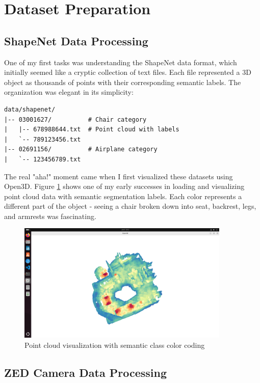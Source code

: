 \documentclass[12pt,a4paper]{report}
\begin{document}
\section{Dataset Preparation}

\subsection{ShapeNet Data Processing}

One of my first tasks was understanding the ShapeNet data format, which initially seemed like a cryptic collection of text files. Each file represented a 3D object as thousands of points with their corresponding semantic labels. The organization was elegant in its simplicity:

\begin{verbatim}
data/shapenet/
|-- 03001627/          # Chair category
|   |-- 678988644.txt  # Point cloud with labels  
|   `-- 789123456.txt
|-- 02691156/          # Airplane category
|   `-- 123456789.txt
\end{verbatim}

The real "aha!" moment came when I first visualized these datasets using Open3D. Figure \ref{fig:point_cloud_visualization} shows one of my early successes in loading and visualizing point cloud data with semantic segmentation labels. Each color represents a different part of the object - seeing a chair broken down into seat, backrest, legs, and armrests was fascinating.

\begin{figure}[htbp]
    \centering
    \includegraphics[width=0.9\textwidth]{figures/pointcloud_visualisation_sonata_demo.png}
    \caption{Point cloud visualization with semantic class color coding}
    \label{fig:point_cloud_visualization}
\end{figure}

\subsection{ZED Camera Data Processing}
\end{document}
